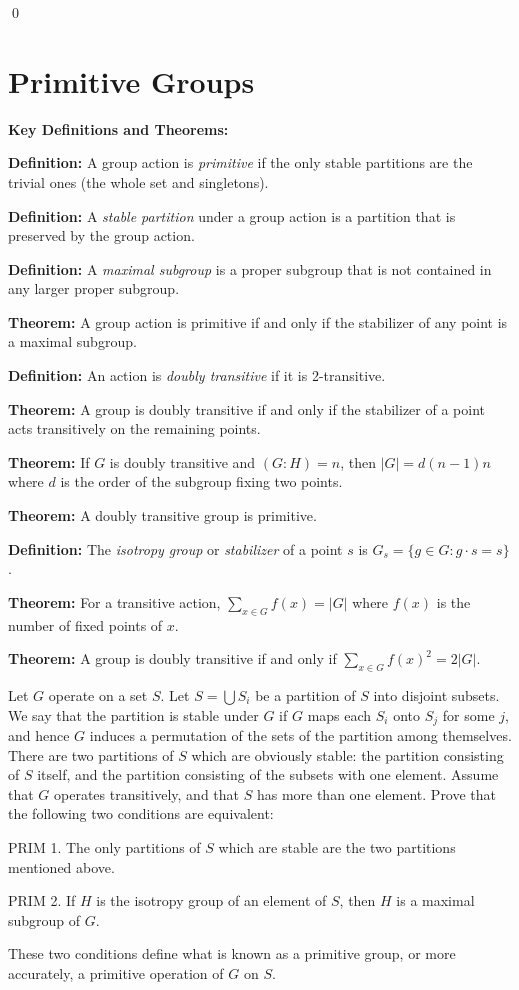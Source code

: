 \qed
\section{Primitive Groups}

\textbf{Key Definitions and Theorems:}

\textbf{Definition:} A group action is \textit{primitive} if the only stable partitions are the trivial ones (the whole set and singletons).

\textbf{Definition:} A \textit{stable partition} under a group action is a partition that is preserved by the group action.

\textbf{Definition:} A \textit{maximal subgroup} is a proper subgroup that is not contained in any larger proper subgroup.

\textbf{Theorem:} A group action is primitive if and only if the stabilizer of any point is a maximal subgroup.

\textbf{Definition:} An action is \textit{doubly transitive} if it is 2-transitive.

\textbf{Theorem:} A group is doubly transitive if and only if the stabilizer of a point acts transitively on the remaining points.

\textbf{Theorem:} If $G$ is doubly transitive and $(G : H) = n$, then $|G| = d(n-1)n$ where $d$ is the order of the subgroup fixing two points.

\textbf{Theorem:} A doubly transitive group is primitive.

\textbf{Definition:} The \textit{isotropy group} or \textit{stabilizer} of a point $s$ is $G_s = \{g \in G : g \cdot s = s\}$.

\textbf{Theorem:} For a transitive action, $\sum_{x \in G} f(x) = |G|$ where $f(x)$ is the number of fixed points of $x$.

\textbf{Theorem:} A group is doubly transitive if and only if $\sum_{x \in G} f(x)^2 = 2|G|$.

\begin{problembox}
Let $G$ operate on a set $S$. Let $S = \bigcup S_i$ be a partition of $S$ into disjoint subsets. We say that the partition is stable under $G$ if $G$ maps each $S_i$ onto $S_j$ for some $j$, and hence $G$ induces a permutation of the sets of the partition among themselves. There are two partitions of $S$ which are obviously stable: the partition consisting of $S$ itself, and the partition consisting of the subsets with one element. Assume that $G$ operates transitively, and that $S$ has more than one element. Prove that the following two conditions are equivalent:

PRIM 1. The only partitions of $S$ which are stable are the two partitions mentioned above.

PRIM 2. If $H$ is the isotropy group of an element of $S$, then $H$ is a maximal subgroup of $G$.

These two conditions define what is known as a primitive group, or more accurately, a primitive operation of $G$ on $S$.
\end{problembox}

